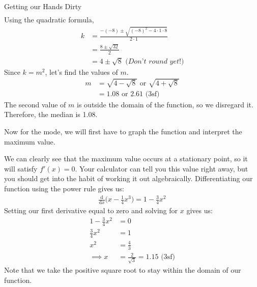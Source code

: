 \begin{example}{Getting our Hands Dirty}
\begin{align}
\end{align}
Using the quadratic formula,
\begin{align}
    k &= \frac{-(-8) \pm \sqrt{(-8)^2 - 4\cdot1\cdot8}}{2 \cdot 1} \\
    &= \frac{8 \pm \sqrt{32}}{2} \\
    &= 4 \pm \sqrt{8} \textit{ (Don't round yet!)}
\end{align}
Since $k = m^2$, let's find the values of $m$.
\begin{align}
    m &= \sqrt{4 - \sqrt{8}} \text{ or } \sqrt{4 + \sqrt{8}} \\
    &= 1.08 \text{ or } 2.61 \text{ (3sf)}
\end{align}
The second value of $m$ is outside the domain of the function, so we disregard it. Therefore, the median is 1.08.

Now for the mode, we will first have to graph the function and interpret the maximum value.
\begin{center}
\end{center}
We can clearly see that the maximum value occurs at a stationary point, so it will satisfy $f'(x) = 0$. Your calculator can tell you this value right away, but you should get into the habit of working it out algebraically. Differentiating our function using the power rule gives us:
\begin{align}
    \frac{\mathrm d}{\mathrm dx}\Big(x - \frac{1}{4}x^3\Big) = 1 - \frac{3}{4}x^2
\end{align}
Setting our first derivative equal to zero and solving for $x$ gives us:
\begin{align}
    1 - \frac{3}{4}x^2 &= 0 \\
    \frac{3}{4}x^2 &= 1 \\
    x^2 &= \frac{4}{3} \\
    \implies x &= \frac{2}{\sqrt{3}} = 1.15 \text{ (3sf)}
\end{align}
Note that we take the positive square root to stay within the domain of our function.
\end{example}

